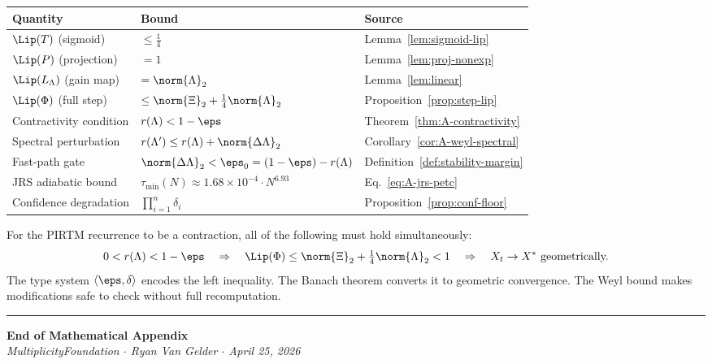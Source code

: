 \documentclass[11pt,letterpaper]{article}
\theoremstyle{pirtmthm}
\theoremstyle{remark}
\begin{document}
\begin{center}
\renewcommand{\arraystretch}{1.5}
\begin{tabular}{lll}
\toprule
\textbf{Quantity} & \textbf{Bound} & \textbf{Source} \\
\midrule
$\Lip(T)$ (sigmoid) & $\leq \tfrac{1}{4}$ & Lemma~\ref{lem:sigmoid-lip} \\
$\Lip(P)$ (projection) & $= 1$ & Lemma~\ref{lem:proj-nonexp} \\
$\Lip(L_\Lambda)$ (gain map) & $= \norm{\Lambda}_2$ & Lemma~\ref{lem:linear} \\
$\Lip(\Phi)$ (full step) & $\leq \norm{\Xi}_2 + \tfrac{1}{4}\norm{\Lambda}_2$ & Proposition~\ref{prop:step-lip} \\
Contractivity condition & $r(\Lambda) < 1 - \eps$ & Theorem~\ref{thm:A-contractivity} \\
Spectral perturbation & $r(\Lambda') \leq r(\Lambda) + \norm{\Delta\Lambda}_2$ & Corollary~\ref{cor:A-weyl-spectral} \\
Fast-path gate & $\norm{\Delta\Lambda}_2 < \eps_0 = (1-\eps) - r(\Lambda)$ & Definition~\ref{def:stability-margin} \\
JRS adiabatic bound & $\tau_{\min}(N) \approx 1.68 \times 10^{-4} \cdot N^{6.93}$ & Eq.~\eqref{eq:A-jrs-petc} \\
Confidence degradation & $\prod_{i=1}^n \delta_i$ & Proposition~\ref{prop:conf-floor} \\
\bottomrule
\end{tabular}
\end{center}

\begin{keybox}
For the PIRTM recurrence to be a contraction, all of the following
must hold simultaneously:
\[
  0 < r(\Lambda) < 1 - \eps
  \quad \Rightarrow \quad
  \Lip(\Phi) \leq \norm{\Xi}_2 + \tfrac{1}{4}\norm{\Lambda}_2 < 1
  \quad \Rightarrow \quad
  X_t \to X^* \text{ geometrically.}
\]
The type system $\langle\eps, \delta\rangle$ encodes the left inequality.
The Banach theorem converts it to geometric convergence.
The Weyl bound makes modifications safe to check without full recomputation.
\end{keybox}

\vspace{2em}
\noindent\rule{\linewidth}{0.5pt}
\begin{center}
\small
\textbf{End of Mathematical Appendix}\\[0.3em]
\textit{MultiplicityFoundation $\cdot$ Ryan Van Gelder $\cdot$ April 25, 2026}
\end{center}
\nocite{*}
  

\end{document}

